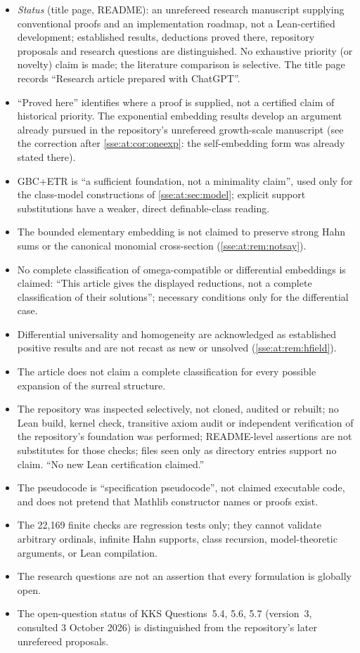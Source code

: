 \documentclass[11pt,a4paper]{article}
\numberwithin{equation}{section}
\theoremstyle{plain}
\theoremstyle{definition}
\theoremstyle{remark}
\begin{document}
\begin{itemize}
\item \emph{Status} (title page, README): an unrefereed research manuscript
supplying conventional proofs and an implementation roadmap, not a
Lean-certified development; established results, deductions proved there,
repository proposals and research questions are distinguished. No exhaustive
priority (or novelty) claim is made; the literature comparison is selective.
The title page records ``Research article prepared with ChatGPT''.
\item ``Proved here'' identifies where a proof is supplied, not a certified
claim of historical priority. The exponential embedding results develop an
argument already pursued in the repository's unrefereed growth-scale
manuscript (see the correction after \cref{sse:at:cor:oneexp}: the
self-embedding form was already stated there).
\item GBC+ETR is ``a sufficient foundation, not a minimality claim'', used only
for the class-model constructions of \cref{sse:at:sec:model}; explicit support
substitutions have a weaker, direct definable-class reading.
\item The bounded elementary embedding is not claimed to preserve strong Hahn
sums or the canonical monomial cross-section (\cref{sse:at:rem:notsay}).
\item No complete classification of omega-compatible or differential
embeddings is claimed: ``This article gives the displayed reductions, not a
complete classification of their solutions''; necessary conditions only for
the differential case.
\item Differential universality and homogeneity are acknowledged as
established positive results and are not recast as new or unsolved
(\cref{sse:at:rem:hfield}).
\item The article does not claim a complete classification for every possible
expansion of the surreal structure.
\item The repository was inspected selectively, not cloned, audited or
rebuilt; no Lean build, kernel check, transitive axiom audit or independent
verification of the repository's foundation was performed;
README-level assertions are not substitutes for those checks; files seen
only as directory entries support no claim. ``No new Lean certification
claimed.''
\item The pseudocode is ``specification pseudocode'', not claimed executable
code, and does not pretend that Mathlib constructor names or proofs exist.
\item The 22,169 finite checks are regression tests only; they cannot validate
arbitrary ordinals, infinite Hahn supports, class recursion, model-theoretic
arguments, or Lean compilation.
\item The research questions are not an assertion that every formulation is
globally open.
\item The open-question status of KKS Questions~5.4, 5.6, 5.7 (version~3,
consulted 3 October 2026) is distinguished from the repository's later
unrefereed proposals.
\end{itemize}
\end{document}
